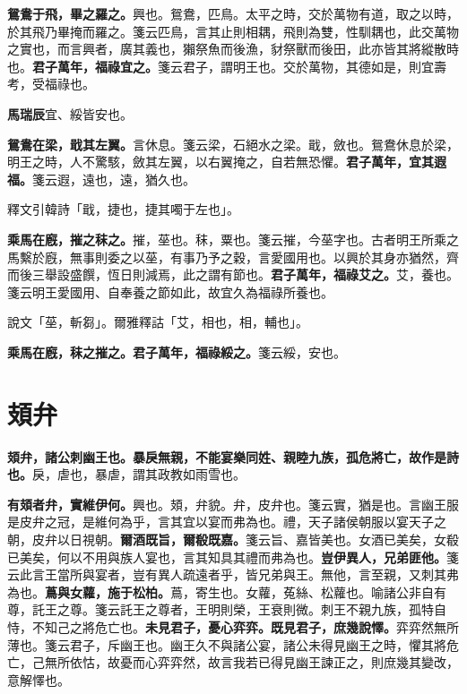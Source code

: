 \textbf{鴛鴦于飛，畢之羅之。}{\footnotesize 興也。鴛鴦，匹鳥。太平之時，交於萬物有道，取之以時，於其飛乃畢掩而羅之。箋云匹鳥，言其止則相耦，飛則為雙，性馴耦也，此交萬物之實也，而言興者，廣其義也，獺祭魚而後漁，豺祭獸而後田，此亦皆其將縱散時也。}\textbf{君子萬年，福祿宜之。}{\footnotesize 箋云君子，謂明王也。交於萬物，其德如是，則宜壽考，受福祿也。}

\begin{quoting}\textbf{馬瑞辰}宜、綏皆安也。\end{quoting}

\textbf{鴛鴦在梁，戢其左翼。}{\footnotesize 言休息。箋云梁，石絕水之梁。戢，斂也。鴛鴦休息於梁，明王之時，人不驚駭，斂其左翼，以右翼掩之，自若無恐懼。}\textbf{君子萬年，宜其遐福。}{\footnotesize 箋云遐，遠也，遠，猶久也。}

\begin{quoting}釋文引韓詩「戢，捷也，捷其噣于左也」。\end{quoting}

\textbf{乘馬在廐，摧之秣之。}{\footnotesize 摧，莝也。秣，粟也。箋云摧，今莝字也。古者明王所乘之馬繫於廐，無事則委之以莝，有事乃予之穀，言愛國用也。以興於其身亦猶然，齊而後三舉設盛饌，恆日則減焉，此之謂有節也。}\textbf{君子萬年，福祿艾之。}{\footnotesize 艾，養也。箋云明王愛國用、自奉養之節如此，故宜久為福祿所養也。}

\begin{quoting}說文「莝，斬芻」。爾雅釋詁「艾，相也，相，輔也」。\end{quoting}

\textbf{乘馬在廐，秣之摧之。君子萬年，福祿綏之。}{\footnotesize 箋云綏，安也。}

\section{頍弁}


\textbf{頍弁，諸公刺幽王也。暴戾無親，不能宴樂同姓、親睦九族，孤危將亡，故作是詩也。}{\footnotesize 戾，虐也，暴虐，謂其政教如雨雪也。}

\textbf{有頍者弁，實維伊何。}{\footnotesize 興也。頍，弁貌。弁，皮弁也。箋云實，猶是也。言幽王服是皮弁之冠，是維何為乎，言其宜以宴而弗為也。禮，天子諸侯朝服以宴天子之朝，皮弁以日視朝。}\textbf{爾酒既旨，爾殽既嘉。}{\footnotesize 箋云旨、嘉皆美也。女酒已美矣，女殽已美矣，何以不用與族人宴也，言其知具其禮而弗為也。}\textbf{豈伊異人，兄弟匪他。}{\footnotesize 箋云此言王當所與宴者，豈有異人疏遠者乎，皆兄弟與王。無他，言至親，又刺其弗為也。}\textbf{蔦與女蘿，施于松柏。}{\footnotesize 蔦，寄生也。女蘿，菟絲、松蘿也。喻諸公非自有尊，託王之尊。箋云託王之尊者，王明則榮，王衰則微。刺王不親九族，孤特自恃，不知己之將危亡也。}\textbf{未見君子，憂心弈弈。既見君子，庶幾說懌。}{\footnotesize 弈弈然無所薄也。箋云君子，斥幽王也。幽王久不與諸公宴，諸公未得見幽王之時，懼其將危亡，己無所依怙，故憂而心弈弈然，故言我若已得見幽王諫正之，則庶幾其變改，意解懌也。}

